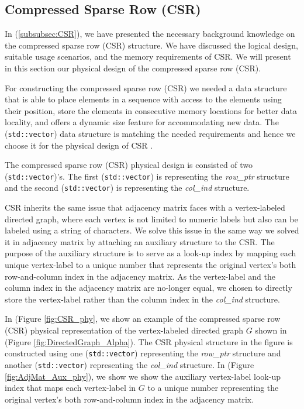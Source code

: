 {\subsection{Compressed Sparse Row (CSR)}
\label{subsec:PhyDesign-CSR}

In (\ref{subsubsec:CSR}), we have presented the necessary background knowledge on the compressed sparse row (CSR) structure. We have discussed the logical design, suitable usage scenarios, and the memory requirements of CSR. We will present in this section our physical design of the compressed sparse row (CSR).

For constructing the compressed sparse row (CSR) we needed a data structure that is able to place elements in a sequence with access to the elements using their position, store the elements in consecutive memory locations for better data locality, and offers a dynamic size feature for accommodating new data. The (\texttt{std::vector}) data structure is matching the needed requirements and hence we choose it for the physical design of CSR \cite{josuttis2012c++}.

The compressed sparse row (CSR) physical design is consisted of two (\texttt{std::vector})'s. The first (\texttt{std::vector}) is representing the \textit{row\_ptr} structure and the second (\texttt{std::vector}) is representing the \textit{col\_ind} structure.

CSR inherits the same issue that adjacency matrix faces with a vertex-labeled directed graph, where each vertex is not limited to numeric labels but also can be labeled using a string of characters. We solve this issue in the same way we solved it in adjacency matrix by attaching an auxiliary structure to the CSR. The purpose of the auxiliary structure is to serve as a look-up index by mapping each unique vertex-label to a unique number that represents the original vertex's both row-and-column index in the adjacency matrix. As the vertex-label and the column index in the adjacency matrix are no-longer equal, we chosen to directly store the vertex-label rather than the column index in the \textit{col\_ind} structure.

In (Figure \ref{fig:CSR_phy}, we show an example of the compressed sparse row (CSR) physical representation of the vertex-labeled directed graph $G$ shown in (Figure \ref{fig:DirectedGraph_Alpha}). The CSR physical structure in the figure is constructed using one (\texttt{std::vector}) representing the \textit{row\_ptr} structure and another (\texttt{std::vector}) representing the \textit{col\_ind} structure. In (Figure \ref{fig:AdjMat_Aux_phy}), we show we show the auxiliary vertex-label look-up index that maps each vertex-label in $G$ to a unique number representing the original vertex's both row-and-column index in the adjacency matrix.


}

